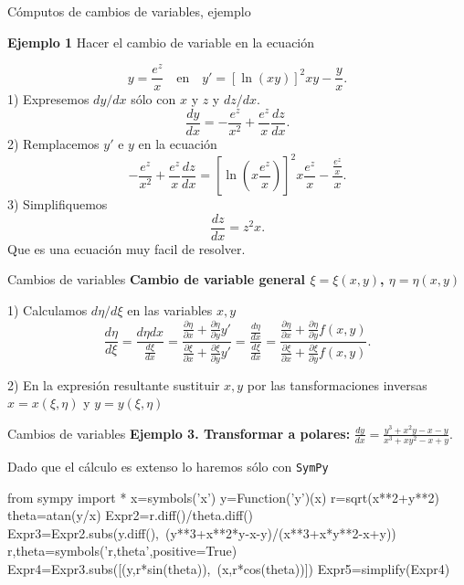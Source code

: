 \documentclass[handout,hyperref={colorlinks=true}]{beamer}
\begin{document}
\begin{frame}{Cómputos de cambios de variables, ejemplo}

\textbf{Ejemplo 1} Hacer el cambio de variable en la  ecuación 

\[y=\frac{e^z}{x}\quad\text{en}\quad  y'=\left[\ln(xy)\right]^2xy-\frac{y}{x}.\]
1) Expresemos $dy/dx$ sólo con $x$ y $z$ y $dz/dx$.
\[\frac{dy}{dx}=-\frac{e^z}{x^2}+\frac{e^z}{x}\frac{dz}{dx}.\]
2) Remplacemos $y'$ e $y$ en la ecuación 
\[-\frac{e^z}{x^2}+\frac{e^z}{x}\frac{dz}{dx}=\left[\ln\left(x \frac{e^z}{x} \right)\right]^2x\frac{e^z}{x}-\frac{\frac{e^z}{x} }{x}.\]
3) Simplifiquemos
\[\frac{dz}{dx}=z^2x.\]
Que es una ecuación muy facil de resolver.


\end{frame}







\begin{frame}{Cambios de variables}
\textbf{Cambio de variable general $\xi=\xi(x,y)$, $\eta=\eta(x,y)$}

1) Calculamos $d\eta/d\xi$ en las variables $x,y$
\begin{equation}\label{eq:subsder}
\frac{d\eta}{d\xi}=\frac{{d\eta}{dx}}{\frac{d\xi}{dx}}=\frac{\frac{\partial\eta}{\partial x}+\frac{\partial\eta}{\partial y}y'}{\frac{\partial\xi}{\partial x}+\frac{\partial\xi}{\partial y}y'}=\frac{\frac{d\eta}{dx}}{\frac{d\xi}{dx}}=\frac{\frac{\partial\eta}{\partial x}+\frac{\partial\eta}{\partial y}f(x,y)}{\frac{\partial\xi}{\partial x}+\frac{\partial\xi}{\partial y}f(x,y)}.
\end{equation}

2) En la expresión resultante sustituir $x,y$ por las tansformaciones inversas $x=x(\xi,\eta)$ y  $y=y(\xi,\eta)$


\end{frame}


\begin{frame}[fragile]{Cambios de variables}
\textbf{Ejemplo 3. Transformar a polares:} $\frac{dy}{dx}=\frac{y^3+x^2y-x-y}{x^3+xy^2-x+y}.$

Dado que el cálculo es extenso lo haremos sólo con \texttt{SymPy}
\begin{sageblock}
from sympy import *
x=symbols('x')
y=Function('y')(x)
r=sqrt(x**2+y**2)
theta=atan(y/x)
Expr2=r.diff()/theta.diff()
Expr3=Expr2.subs(y.diff(),\
(y**3+x**2*y-x-y)/(x**3+x*y**2-x+y))
r,theta=symbols('r,theta',positive=True)
Expr4=Expr3.subs([(y,r*sin(theta)),\
(x,r*cos(theta))])
Expr5=simplify(Expr4)
\end{sageblock}
\end{frame}
\end{document}
